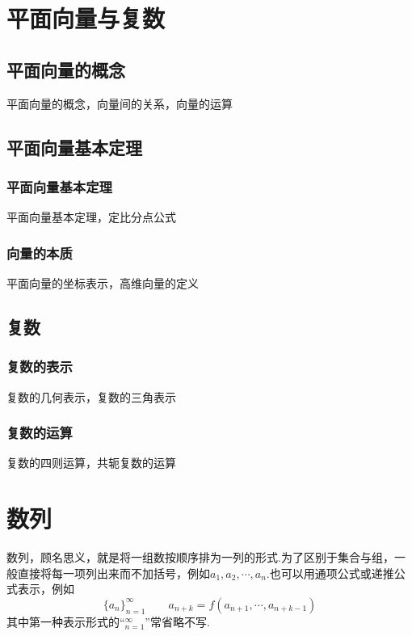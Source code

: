 \documentclass[lang=cn, zihao=4.5]{elegantbook}
\begin{document}
\chapter{平面向量与复数}

\section{平面向量的概念}

平面向量的概念，向量间的关系，向量的运算

\section{平面向量基本定理}

\subsection{平面向量基本定理}

平面向量基本定理，定比分点公式

\subsection{向量的本质}

平面向量的坐标表示，高维向量的定义

\section{复数}

\subsection{复数的表示}

复数的几何表示，复数的三角表示

\subsection{复数的运算}

复数的四则运算，共轭复数的运算

\chapter{数列}

数列，顾名思义，就是将一组数按顺序排为一列的形式.为了区别于集合与组，一般直接将每一项列出来而不加括号，例如$a_1,a_2, \cdots ,a_n$.也可以用通项公式或递推公式表示，例如
$$\{ a_n \}_{n=1}^{\infty} \qquad a_{n+k}=f(a_{n+1}, \cdots ,a_{n+k-1})$$
其中第一种表示形式的“$_{n=1}^{\infty}$”常省略不写.
\end{document}
